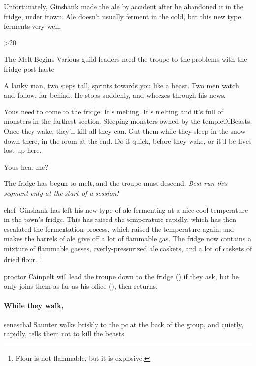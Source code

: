 Unfortunately, Ginshank made the ale by accident after he abandoned it in the fridge, under \gls{ftown}.
Ale doesn't usually ferment in the cold, but this new type ferments very well.

\ifcase\thecycle%
  \hibernationSegment
\or%
\or%
  \ifnum\thefenestraDay>20%
    \hibernationSegment
  \fi%
\else%
  \hibernationSegment
\fi%

{The Melt Begins}%
{Various guild leaders need the troupe to the problems with the fridge post-haste}%
\label{meltBegins}

\begin{boxtext}
  A lanky man, two \glspl{step} tall, sprints towards you like a beast.
  Two men watch and follow, far behind.
  He stops suddenly, and wheezes through his news.

  \begin{speechtext}
    Yous need to come to the fridge.
    It's melting.
    It's melting and it's full of \glspl{monster} in the farthest section.
    Sleeping \glspl{monster} owned by the \gls{templeOfBeasts}.
    Once they wake, they'll kill all they can.
    Gut them while they sleep in the snow down there, in the room at the end.
    Do it quick, before they wake, or it'll be lives lost up here.

    Yous hear me?
  \end{speechtext}
\end{boxtext}

The fridge has begun to melt, and the troupe must descend.
\emph{Best run this \gls{segment} only at the start of a session!}

\Gls{chef}~Ginshank has left his new type of ale fermenting at a nice cool temperature in the town's fridge.
This has raised the temperature rapidly, which has then escalated the fermentation process, which raised the temperature again, and makes the barrels of ale give off a lot of flammable gas.
The fridge now contains a mixture of flammable gasses, overly-pressurized ale caskets, and a lot of caskets of dried flour.%
\footnote{Flour is not flammable, but it is explosive.}

\Gls{proctor} Cainpelt will lead the troupe down to the fridge () if they ask, but he only joins them as far as his office (), then returns.

\paragraph{While they walk,}
\gls{seneschal} Saunter walks briskly to the \gls{pc} at the back of the group, and quietly, rapidly, tells them not to kill the beasts.

